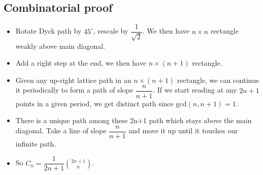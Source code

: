 \subsection{Combinatorial proof}
\begin{itemize}
\item Rotate Dyck path by $45^{\circ}$, rescale by $\dfrac{1}{\sqrt{2}}$. We then have $n\times n$ rectangle weakly above main diagonal.
\item Add a right step at the end, we then have $n\times (n+1)$ rectangle.
\item Given any up-right lattice path in an $n\times (n+1)$ rectangle, we can continue it periodically to form a path of slope $\dfrac{n}{n+1}$. If we start reading at any $2n+1$ points in a given period, we get distinct path since $\mathrm{gcd}(n,n+1)=1$.
\item There is a unique path among these 2n+1 path which stays above the main diagonal. Take a line of slope $\dfrac{n}{n+1}$ and move it up until it touches our infinite path.
\item So $C_n = \dfrac{1}{2n+1}{\binom{2n+1}{n}}$.
\end{itemize}



